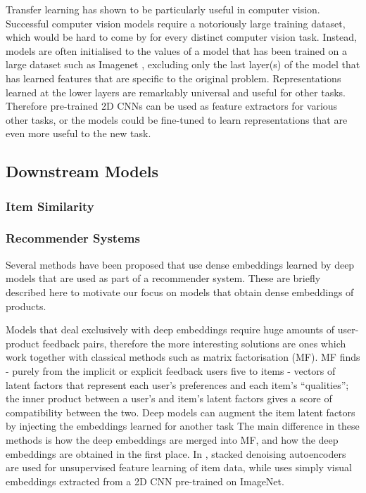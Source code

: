 Transfer learning has shown to be particularly useful in computer vision.
Successful computer vision models require a notoriously large training dataset, which would be hard to come by for every distinct computer vision task.
Instead, models are often initialised to the values of a model that has been trained on a large dataset such as Imagenet \cite{}, excluding only the last layer(s) of the model that has learned features that are specific to the original problem.
Representations learned at the lower layers are remarkably  universal and useful for other tasks.
Therefore pre-trained 2D CNNs can be used as feature extractors for various other tasks,  or the models could be fine-tuned to learn representations that are even more useful to the new task.

\subsection{Downstream Models}

\subsubsection{Item Similarity}
\label{bg_sim}

\subsubsection{Recommender Systems}
\label{rec}

Several methods have been proposed that use dense embeddings learned by deep models that are used as part of a recommender system.
These are briefly described here to motivate our focus on models that obtain dense embeddings of products.

Models that deal exclusively with deep embeddings \cite{mvdl} require huge amounts of user-product feedback pairs, therefore the more interesting solutions are ones which work together with classical methods such as matrix factorisation (MF).
MF finds - purely from the implicit or explicit feedback users five to items - vectors of latent factors that represent each user's preferences and each item's ``qualities''; the inner product between a user's and item's latent factors gives a score of compatibility between the two.
Deep models can augment the item latent factors by injecting the embeddings learned for another task
The main difference in these methods is how the deep embeddings are merged into MF, and how the deep embeddings are obtained in the first place.
In \cite{cdl}, stacked denoising autoencoders are used for unsupervised feature learning of item data, while \cite{dl_mf} uses simply visual embeddings extracted from a 2D CNN pre-trained on ImageNet.

